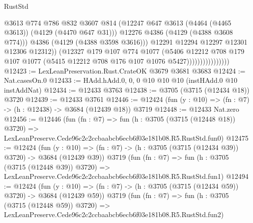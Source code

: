 \begin{lexlean}{RustStd}
\begin{coremodule}
                                      @3613
                                      @774
                                      @786
                                      @832
                                      @3607
                                      @814
                                      (@12247
                                        @647
                                        @3613
                                        (@4464 (@4465 @3613))
                                        (@4129 (@4470 @647 @31)))
                                      @12276
                                      @4386
                                      (@4129 (@4388 @3608 @774)))
                                    @4386
                                    (@4129 (@4388 @3598 @3616)))
                                  @12291
                                  @12294
                                  @12297
                                  @12301
                                  @12306
                                  @12312))
                              (@12327
                                @179
                                @107
                                @774
                                @1077
                                (@5406
                                  @12212
                                  @708
                                  @179
                                  @107
                                  @1077
                                  (@5415 @12212 @708 @176 @107 @1076 @5427))))))))))))))))
@12423 := LexLeanPreservation.Rust.CrateOK @3679 @3681 @3683
@12424 := Nat.casesOn.{0}
@12433 := HAdd.hAdd.{0, 0, 0} @10 @10 @10 (instHAdd.{0} @10 instAddNat)
@12434 := @12433 @3763
@12438 := @3705 (@3715 (@12434 @18)) @3720
@12439 := @12433 @3761
@12446 := @12424 (fun (y : @10) => (fn : @7) -> (h : @12438) -> @3684 (@12439 @18)) @3719
@12448 := @12433 Nat.zero
@12456 := @12446
    (fun (fn : @7) =>
    fun (h : @3705 (@3715 (@12448 @18)) @3720) =>
    LexLeanPreserve.Cede96c2c2ccbaabcb6ecb6f03e181b08.R5.RustStd.fun0)
@12475 := @12424
    (fun (y : @10) => (fn : @7) -> (h : @3705 (@3715 (@12434 @39)) @3720) -> @3684 (@12439 @39))
    @3719
    (fun (fn : @7) =>
    fun (h : @3705 (@3715 (@12448 @39)) @3720) =>
    LexLeanPreserve.Cede96c2c2ccbaabcb6ecb6f03e181b08.R5.RustStd.fun1)
@12494 := @12424
    (fun (y : @10) => (fn : @7) -> (h : @3705 (@3715 (@12434 @59)) @3720) -> @3684 (@12439 @59))
    @3719
    (fun (fn : @7) =>
    fun (h : @3705 (@3715 (@12448 @59)) @3720) =>
    LexLeanPreserve.Cede96c2c2ccbaabcb6ecb6f03e181b08.R5.RustStd.fun2)

\end{coremodule}
\end{lexlean}
